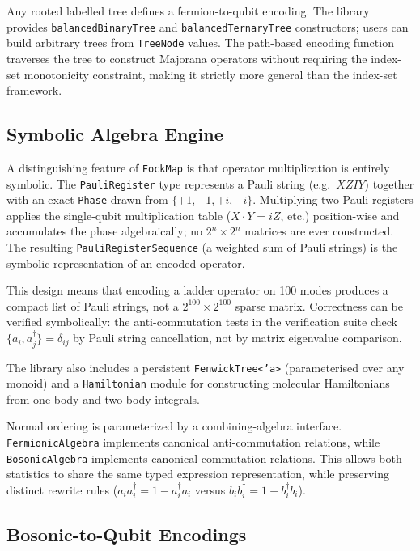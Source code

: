 \documentclass[10pt,a4paper]{article}
\begin{document}
Any rooted labelled tree defines a fermion-to-qubit encoding.  The
library provides \texttt{balancedBinaryTree} and
\texttt{balancedTernaryTree} constructors; users can build arbitrary
trees from \texttt{TreeNode} values.  The path-based encoding function
traverses the tree to construct Majorana operators without requiring the
index-set monotonicity constraint, making it strictly more general than
the index-set framework.

\subsection*{Symbolic Algebra Engine}

A distinguishing feature of \texttt{FockMap} is that operator
multiplication is entirely symbolic.  The \texttt{PauliRegister} type
represents a Pauli string (e.g.\ $XZIY$) together with an exact
\texttt{Phase} drawn from $\{+1, -1, +i, -i\}$.  Multiplying two Pauli
registers applies the single-qubit multiplication table
($X \cdot Y = iZ$, etc.)  position-wise and accumulates the phase
algebraically; no $2^n \times 2^n$ matrices are ever constructed.
The resulting \texttt{PauliRegisterSequence} (a weighted sum of Pauli
strings) is the symbolic representation of an encoded operator.

This design means that encoding a ladder operator on 100 modes produces
a compact list of Pauli strings, not a $2^{100} \times 2^{100}$ sparse
matrix.  Correctness can be verified symbolically: the anti-commutation
tests in the verification suite check $\{a_i, a^\dagger_j\} =
\delta_{ij}$ by Pauli string cancellation, not by matrix eigenvalue
comparison.

The library also includes a persistent \texttt{FenwickTree<'a>}
(parameterised over any monoid) and a \texttt{Hamiltonian} module for
constructing molecular Hamiltonians from one-body and two-body integrals.

Normal ordering is parameterized by a combining-algebra interface.
\texttt{FermionicAlgebra} implements canonical anti-commutation
relations, while \texttt{BosonicAlgebra} implements canonical
commutation relations.  This allows both statistics to share the same
typed expression representation, while preserving distinct rewrite rules
($a_i a_i^\dagger = 1 - a_i^\dagger a_i$ versus
$b_i b_i^\dagger = 1 + b_i^\dagger b_i$).

\subsection*{Bosonic-to-Qubit Encodings}
\end{document}
